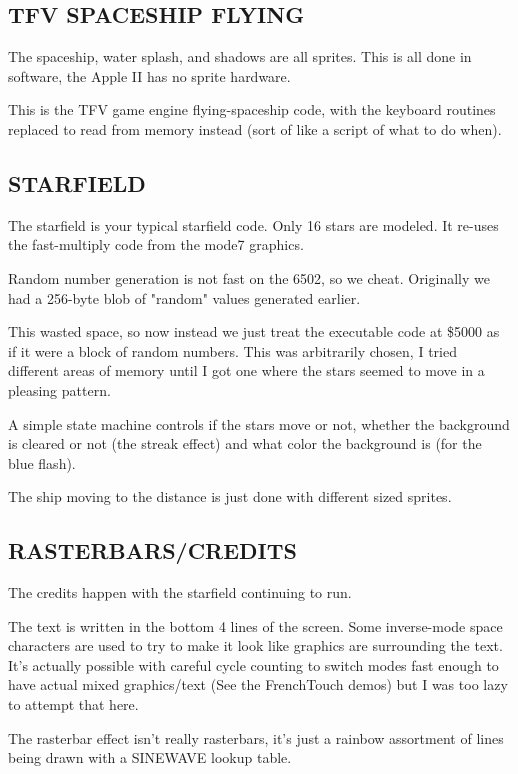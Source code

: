 \documentclass[twocolumn]{article}
\begin{document}
\subsection{TFV SPACESHIP FLYING}

  The spaceship, water splash, and shadows are all sprites.  This is all
  done in software, the Apple II has no sprite hardware.

  This is the TFV game engine flying-spaceship code, with the keyboard
  routines replaced to read from memory instead (sort of like a script
  of what to do when). 

\subsection{STARFIELD}

  The starfield is your typical starfield code.  Only 16 stars are modeled.
  It re-uses the fast-multiply code from the mode7 graphics.

  Random number generation is not fast on the 6502, so we cheat.
  Originally we had a 256-byte blob of "random" values generated earlier.

  This wasted space, so now instead we just treat the executable code
  at \$5000 as if it were a block of random numbers.  This was arbitrarily
  chosen, I tried different areas of memory until I got one where the
  stars seemed to move in a pleasing pattern.

  A simple state machine controls if the stars move or not, whether the
  background is cleared or not (the streak effect) and what color the
  background is (for the blue flash).

  The ship moving to the distance is just done with different sized sprites.

\subsection{RASTERBARS/CREDITS}

  The credits happen with the starfield continuing to run.

  The text is written in the bottom 4 lines of the screen.  Some inverse-mode
  space characters are used to try to make it look like graphics are surrounding
  the text.  It's actually possible with careful cycle counting to switch
  modes fast enough to have actual mixed graphics/text (See the FrenchTouch
  demos) but I was too lazy to attempt that here.

  The rasterbar effect isn't really rasterbars, it's just a rainbow assortment
  of lines being drawn with a SINEWAVE lookup table.
\end{document}
